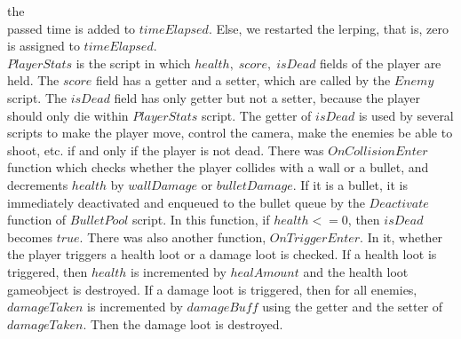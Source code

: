 \documentclass[a4paper]{article}
\begin{document}
\begin{minipage}{\dimexpr\textwidth-1cm}
the\vspace{0.3cm}\\ passed time is added to $timeElapsed$. Else, we restarted the lerping, that is, zero is assigned to $timeElapsed$. \\
\hspace{0.5cm}$PlayerStats$ is the script in which $health,\; score,\; isDead$ fields of the player are held. The $score$ field has a getter and a setter, which are called by the $Enemy$ script. The $isDead$ field has only getter but not a setter, because the player should only die within $PlayerStats$ script. The getter of $isDead$ is used by several scripts to make the player move, control the camera, make the enemies be able to shoot, etc. if and only if the player is not dead. There was $OnCollisionEnter$ function which checks whether the player collides with a wall or a bullet, and decrements $health$ by $wallDamage$ or $bulletDamage$. If it is a bullet, it is immediately deactivated and enqueued to the bullet queue by the $Deactivate$ function of $BulletPool$ script. In this function, if $health <= 0$, then $isDead$ becomes $true$. There was also another function, $OnTriggerEnter$. In it, whether the player triggers a health loot or a damage loot is checked. If a health loot is triggered, then $health$ is incremented by $healAmount$ and the health loot gameobject is destroyed. If a damage loot is triggered, then for all enemies, $damageTaken$ is incremented by $damageBuff$ using the getter and the setter of $damageTaken$. Then the damage loot is destroyed.\\
\end{minipage}

\newpage
\end{document}
